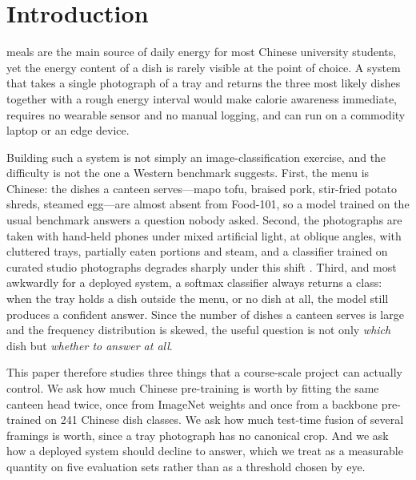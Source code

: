 \section{Introduction}
 meals are the main source of daily energy for most
Chinese university students, yet the energy content of a dish is rarely visible
at the point of choice. A system that takes a single photograph of a tray and
returns the three most likely dishes together with a rough energy interval would
make calorie awareness immediate, requires no wearable sensor and no manual
logging, and can run on a commodity laptop or an edge device.

Building such a system is not simply an image-classification exercise, and the
difficulty is not the one a Western benchmark suggests. First, the menu is
Chinese: the dishes a canteen serves---mapo tofu, braised pork, stir-fried potato
shreds, steamed egg---are almost absent from Food-101, so a model trained on the
usual benchmark answers a question nobody asked. Second, the photographs are
taken with hand-held phones under mixed artificial light, at oblique angles, with
cluttered trays, partially eaten portions and steam, and a classifier trained on
curated studio photographs degrades sharply under this shift
\cite{hendrycks2019robustness}. Third, and most awkwardly for a deployed system,
a softmax classifier always returns a class: when the tray holds a dish outside
the menu, or no dish at all, the model still produces a confident answer. Since
the number of dishes a canteen serves is large and the frequency distribution is
skewed, the useful question is not only \emph{which} dish but \emph{whether to
answer at all}.

This paper therefore studies three things that a course-scale project can
actually control. We ask how much Chinese pre-training is worth by fitting the
same canteen head twice, once from ImageNet weights and once from a backbone
pre-trained on 241 Chinese dish classes. We ask how much test-time fusion of
several framings is worth, since a tray photograph has no canonical crop. And we
ask how a deployed system should decline to answer, which we treat as a
measurable quantity on five evaluation sets rather than as a threshold chosen by
eye.

